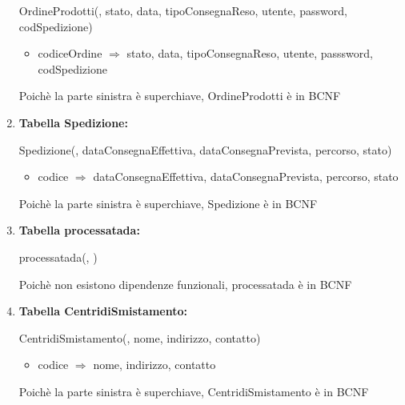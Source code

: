 \documentclass[12pt,a4paper]{article}
\begin{document}
\begin{enumerate}
OrdineProdotti(\underline{}, stato, data, tipoConsegnaReso,  utente,  password,  codSpedizione)
\begin{itemize}
\vspace{-5pt}
\item codiceOrdine $\Rightarrow$ stato, data, tipoConsegnaReso, utente, passsword, codSpedizione
\vspace{-5pt}
\end{itemize}
Poichè la parte sinistra è superchiave, OrdineProdotti è in BCNF
\vspace{10pt}



\item[] \textbf{Tabella Spedizione:}

Spedizione(\underline{}, dataConsegnaEffettiva, dataConsegnaPrevista, percorso, stato)
\begin{itemize}
\vspace{-5pt}
\item codice $\Rightarrow$ dataConsegnaEffettiva, dataConsegnaPrevista, percorso, stato
\vspace{-5pt}
\end{itemize}
Poichè la parte sinistra è superchiave, Spedizione è in BCNF
\vspace{10pt}



\item[] \textbf{Tabella processatada:}

processatada(\underline{}, \underline{})

Poichè non esistono dipendenze funzionali, processatada è in BCNF
\vspace{10pt}



\item[] \textbf{Tabella CentridiSmistamento:}

CentridiSmistamento(\underline{}, nome, indirizzo, contatto)
\begin{itemize}
\vspace{-5pt}
\item codice $\Rightarrow$ nome, indirizzo, contatto
\vspace{-5pt}
\end{itemize}
Poichè la parte sinistra è superchiave, CentridiSmistamento è in BCNF
\vspace{10pt}


\end{enumerate}
\end{document}
